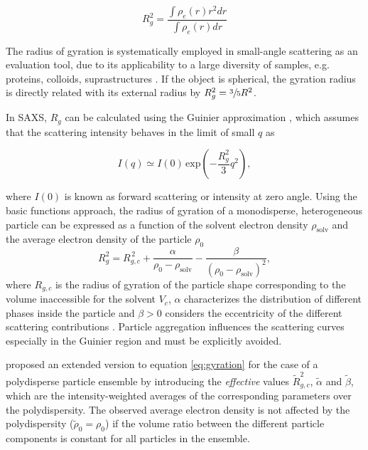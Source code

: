 \begin{equation}
        R_g^2 = \frac{\int \rho_e (r) r^2 dr}{\int \rho_e (r)  dr}
\end{equation}

The radius of gyration is systematically employed in small-angle scattering as an evaluation tool, due to its applicability to a large diversity of samples, e.g. proteins, colloids, suprastructures \citep{mertens_structural_2010,sim_salt_2012}. If the object is spherical, the gyration radius is directly related with its external radius by $R_g^2 = \sfrac{3}{5}R^2$.

In SAXS, $R_g$ can be calculated using the Guinier approximation \citep{guinier_diffraction_1939,guinier_small-angle_1955}, which assumes that the scattering intensity behaves in the limit of small \(q\) as

\begin{equation}
\label{eq:guinier}
I(q) \simeq I(0)\,\mbox{exp}\left(-\frac{R_g^2}{3}q^2\right),
\end{equation}

where \( I(0)\) is known as forward scattering or intensity at zero angle. Using the basic functions approach, the radius of gyration of a monodisperse, heterogeneous particle can be expressed as a function of the solvent electron density \( \rho_{\text{solv}} \) and the average electron density of the particle \( \rho_0 \) \citep{feigin_structure_1987}
\begin{equation}
R_g^2=R_{g,c}^{\,2}+\frac{\alpha}{\rho_0-\rho_{\text{solv}}}-\frac{\beta}{(\rho_0-\rho_{\text{solv}})^2},
\label{eq:gyration}
\end{equation}
where \(R_{g,c}\) is the radius of gyration of the particle shape corresponding to the volume inaccessible for the solvent \( V_c \), \( \alpha \) characterizes the distribution of different phases inside the particle and \( \beta>0 \) considers the eccentricity of the different scattering contributions \citep{stuhrmann_small-angle_2008}. Particle aggregation influences the scattering curves especially in the Guinier region and must be explicitly avoided.

\cite{avdeev_contrast_2007} proposed an extended version to equation \eqref{eq:gyration} for the case of a polydisperse particle ensemble by introducing the \emph{effective} values \( \tilde R^2_{g,c} \), \( \tilde \alpha \) and \( \tilde \beta \), which are the intensity-weighted averages of the corresponding parameters over the polydispersity. The observed average electron density is not affected by the polydispersity (\( \tilde\rho_0=\rho_0 \)) if the volume ratio between the different particle components is constant for all particles in the ensemble.

